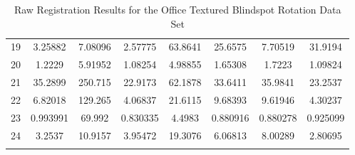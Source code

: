 \begin{center}
\begin{longtable}{cccccccc}
19 & 3.25882 & 7.08096 & 2.57775 & 63.8641 & 25.6575 & 7.70519 & 31.9194\\
20 & 1.2229 & 5.91952 & 1.08254 & 4.98855 & 1.65308 & 1.7223 & 1.09824\\
21 & 35.2899 & 250.715 & 22.9173 & 62.1878 & 33.6411 & 35.9841 & 23.2537\\
22 & 6.82018 & 129.265 & 4.06837 & 21.6115 & 9.68393 & 9.61946 & 4.30237\\
23 & 0.993991 & 69.992 & 0.830335 & 4.4983 & 0.880916 & 0.880278 & 0.925099\\
24 & 3.2537 & 10.9157 & 3.95472 & 19.3076 & 6.06813 & 8.00289 & 2.80695\\
\caption{Raw Registration Results for the Office Textured Blindspot Rotation Data Set}
\label{tab:officetexturedblindspotrotationFULL}
\end{longtable}
\end{center}



